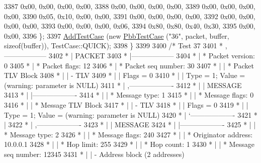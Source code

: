 \begin{DoxyCode}
3387       0x00, 0x00, 0x00, 0x00,
3388       0x00, 0x00, 0x00, 0x00,
3389       0x00, 0x00, 0x00, 0x00,
3390       0x05, 0x10, 0x00, 0x00,
3391       0x00, 0x00, 0x00, 0x00,
3392       0x00, 0x00, 0x00, 0x00,
3393       0x00, 0x00, 0x00, 0x06,
3394       0x80, 0x80, 0x40, 0x30,
3395       0x00, 0x00,
3396     \};
3397     \hyperlink{classns3_1_1TestCase_a3718088e3eefd5d6454569d2e0ddd835}{AddTestCase} (\textcolor{keyword}{new} \hyperlink{classPbbTestCase}{PbbTestCase} (\textcolor{stringliteral}{"36"}, packet, buffer, \textcolor{keyword}{sizeof}(buffer)), 
      TestCase::QUICK);
3398   \}
3399 
3400   \textcolor{comment}{/* Test 37}
3401 \textcolor{comment}{         * ,------------------}
3402 \textcolor{comment}{         * |  PACKET}
3403 \textcolor{comment}{         * |------------------}
3404 \textcolor{comment}{         * | * Packet version:    0}
3405 \textcolor{comment}{         * | * Packet flags:  12}
3406 \textcolor{comment}{         * | * Packet seq number: 30}
3407 \textcolor{comment}{         * |    | * Packet TLV Block}
3408 \textcolor{comment}{         * |    |     - TLV}
3409 \textcolor{comment}{         * |    |         Flags = 0}
3410 \textcolor{comment}{         * |    |         Type = 1; Value = (warning: parameter is NULL)}
3411 \textcolor{comment}{         * |    ,-------------------}
3412 \textcolor{comment}{         * |    |  MESSAGE}
3413 \textcolor{comment}{         * |    |-------------------}
3414 \textcolor{comment}{         * |    | * Message type:       1}
3415 \textcolor{comment}{         * |    | * Message flags:  0}
3416 \textcolor{comment}{         * |    | * Message TLV Block}
3417 \textcolor{comment}{         * |    |     - TLV}
3418 \textcolor{comment}{         * |    |         Flags = 0}
3419 \textcolor{comment}{         * |    |         Type = 1; Value = (warning: parameter is NULL)}
3420 \textcolor{comment}{         * |    `-------------------}
3421 \textcolor{comment}{         * |}
3422 \textcolor{comment}{         * |    ,-------------------}
3423 \textcolor{comment}{         * |    |  MESSAGE}
3424 \textcolor{comment}{         * |    |-------------------}
3425 \textcolor{comment}{         * |    | * Message type:       2}
3426 \textcolor{comment}{         * |    | * Message flags:  240}
3427 \textcolor{comment}{         * |    | * Originator address: 10.0.0.1}
3428 \textcolor{comment}{         * |    | * Hop limit:          255}
3429 \textcolor{comment}{         * |    | * Hop count:          1}
3430 \textcolor{comment}{         * |    | * Message seq number: 12345}
3431 \textcolor{comment}{         * |    | - Address block (2 addresses)}

\end{DoxyCode}
